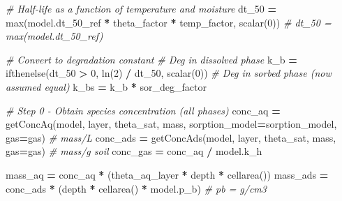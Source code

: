 \documentclass[]{article}
\newenvironment{Shaded}{\begin{snugshade}}{\end{snugshade}}
\newcommand{\DecValTok}[1]{\textcolor[rgb]{0.00,0.00,0.81}{{#1}}}
\newcommand{\CommentTok}[1]{\textcolor[rgb]{0.56,0.35,0.01}{\textit{{#1}}}}
\newcommand{\OperatorTok}[1]{\textcolor[rgb]{0.81,0.36,0.00}{\textbf{{#1}}}}
\newcommand{\BuiltInTok}[1]{{#1}}
\newcommand{\NormalTok}[1]{{#1}}
\begin{document}
\begin{Shaded}
\begin{Highlighting}[]
    \CommentTok{# Half-life as a function of temperature and moisture}
    \NormalTok{dt_50 }\OperatorTok{=} \BuiltInTok{max}\NormalTok{(model.dt_50_ref }\OperatorTok{*} \NormalTok{theta_factor }\OperatorTok{*} \NormalTok{temp_factor, scalar(}\DecValTok{0}\NormalTok{))}
    \CommentTok{# dt_50 = max(model.dt_50_ref)}

    \CommentTok{# Convert to degradation constant}
    \CommentTok{# Deg in dissolved phase}
    \NormalTok{k_b }\OperatorTok{=} \NormalTok{ifthenelse(dt_50 }\OperatorTok{>} \DecValTok{0}\NormalTok{, ln(}\DecValTok{2}\NormalTok{) }\OperatorTok{/} \NormalTok{dt_50,}
                     \NormalTok{scalar(}\DecValTok{0}\NormalTok{))  }
    \CommentTok{# Deg in sorbed phase (now assumed equal)}
    \NormalTok{k_bs }\OperatorTok{=} \NormalTok{k_b }\OperatorTok{*} \NormalTok{sor_deg_factor}

    \CommentTok{# Step 0 - Obtain species concentration (all phases)}
    \NormalTok{conc_aq }\OperatorTok{=} \NormalTok{getConcAq(model, layer, theta_sat, mass,}
                        \NormalTok{sorption_model}\OperatorTok{=}\NormalTok{sorption_model, gas}\OperatorTok{=}\NormalTok{gas)  }\CommentTok{# mass/L}
    \NormalTok{conc_ads }\OperatorTok{=} \NormalTok{getConcAds(model, layer, theta_sat, mass, gas}\OperatorTok{=}\NormalTok{gas)  }\CommentTok{# mass/g soil}
    \NormalTok{conc_gas }\OperatorTok{=} \NormalTok{conc_aq }\OperatorTok{/} \NormalTok{model.k_h}

    \NormalTok{mass_aq }\OperatorTok{=} \NormalTok{conc_aq }\OperatorTok{*} \NormalTok{(theta_aq_layer }\OperatorTok{*} \NormalTok{depth }\OperatorTok{*} \NormalTok{cellarea())}
    \NormalTok{mass_ads }\OperatorTok{=} \NormalTok{conc_ads }\OperatorTok{*} \NormalTok{(depth }\OperatorTok{*} \NormalTok{cellarea() }\OperatorTok{*} \NormalTok{model.p_b)  }\CommentTok{# pb = g/cm3}


\end{Highlighting}
\end{Shaded}
\end{document}
